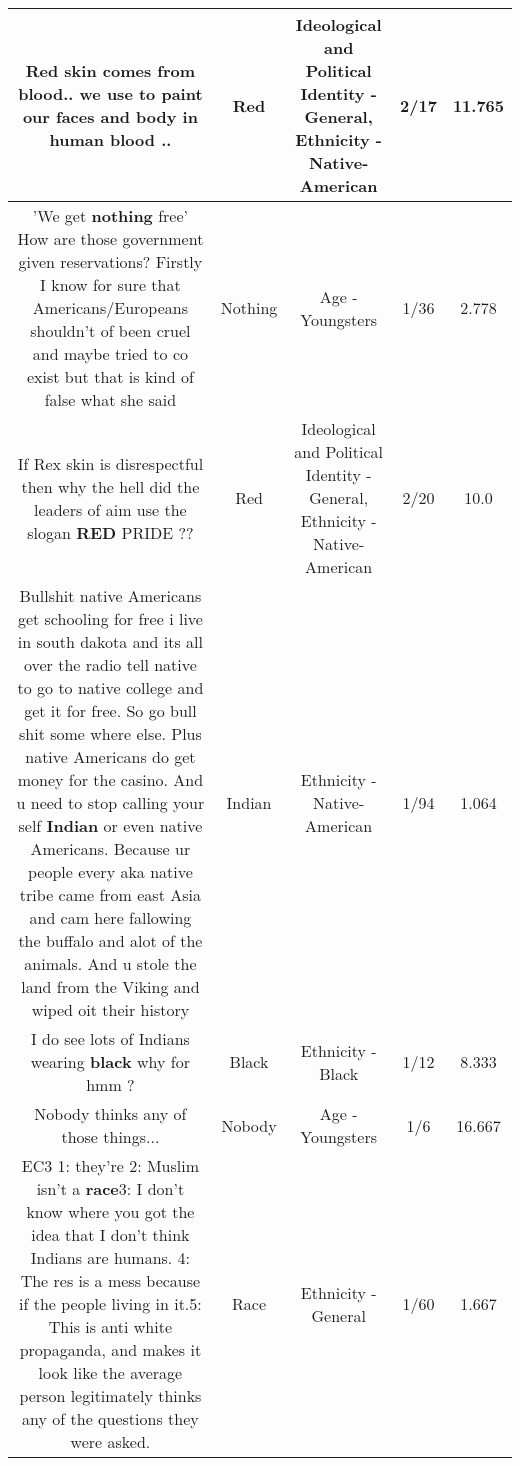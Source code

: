\documentclass[11pt]{article}
\newlength\mylength
\begin{document}
\begin{center}
\begin{longtable}{|C{.65\mylength}|C{.30\mylength}|C{.12\mylength}|C{.12\mylength}|C{.12\mylength}|}
  \small Red skin comes from blood.. we use to paint our faces and body  in human blood ..\normalsize   & Red &  Ideological and Political Identity - General, Ethnicity - Native-American & 2/17 & 11.765 \\  \hline
  \small 'We get \textbf{nothing} free' How are those government given reservations? Firstly I know for sure that Americans/Europeans shouldn't of been cruel and maybe tried to co exist but that is kind of false what she said\normalsize   & Nothing & Age - Youngsters & 1/36 & 2.778 \\  \hline
  \small If Rex skin is disrespectful then why the hell did the leaders of aim use the slogan \textbf{R\textbf{ED}} PRIDE ??\normalsize   & Red &  Ideological and Political Identity - General, Ethnicity - Native-American & 2/20 & 10.0 \\  \hline
  \small Bullshit native Americans get schooling for free i live in south dakota and its all over the radio tell native to go to native college and get it for free.  So go bull shit some where else.  Plus native Americans do get money for the casino.  And u need to stop calling your self \textbf{Indian} or even native Americans.  Because ur people every aka native tribe came from east Asia and cam here fallowing the buffalo and alot of the animals.  And u stole the land from the Viking and wiped oit their history\normalsize   & Indian & Ethnicity - Native-American & 1/94 & 1.064 \\  \hline
  \small I do see lots of Indians wearing \textbf{black} why for hmm ?\normalsize   & Black & Ethnicity - Black & 1/12 & 8.333 \\  \hline
  \small Nobody thinks any of those things...\normalsize   & Nobody & Age - Youngsters & 1/6 & 16.667 \\  \hline
  \small EC3 1: they're 2: Muslim isn't a \textbf{race}3: I don't know where you got the idea that I don't think Indians are humans. 4: The res is a mess because if the people living in it.5: This is anti white propaganda, and makes it look like the average person legitimately thinks any of the questions they were asked.\normalsize   & Race & Ethnicity - General & 1/60 & 1.667 \\  \hline

\end{longtable}
\end{center}
\end{document}
